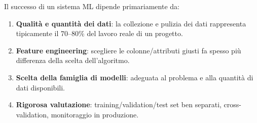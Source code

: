 Il successo di un sistema ML dipende primariamente da:
\begin{enumerate}
    \item \textbf{Qualità e quantità dei dati}: la collezione e pulizia dei dati rappresenta tipicamente il 70--80\% del lavoro reale di un progetto.
    \item \textbf{Feature engineering}: scegliere le colonne/attributi giusti fa spesso più differenza della scelta dell'algoritmo.
    \item \textbf{Scelta della famiglia di modelli}: adeguata al problema e alla quantità di dati disponibili.
    \item \textbf{Rigorosa valutazione}: training/validation/test set ben separati, cross-validation, monitoraggio in produzione.
\end{enumerate}